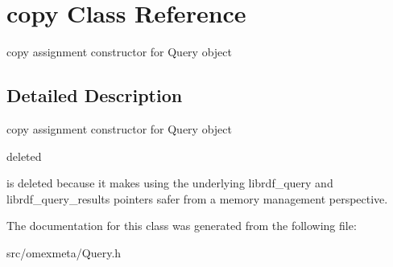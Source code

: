 \hypertarget{classcopy}{}\section{copy Class Reference}
\label{classcopy}


copy assignment constructor for Query object  




\subsection{Detailed Description}
copy assignment constructor for Query object 

deleted

is deleted because it makes using the underlying librdf\+\_\+query and librdf\+\_\+query\+\_\+results pointers safer from a memory management perspective. 

The documentation for this class was generated from the following file\+:\begin{DoxyCompactItemize}
\item 
src/omexmeta/Query.\+h\end{DoxyCompactItemize}
